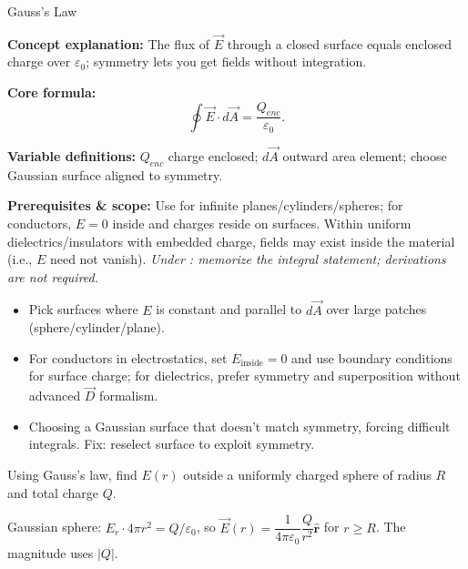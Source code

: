 \begin{KnowledgePoint}{Gauss's Law \Core}
  \KPFormulas
  \begin{formulabox}
  \textbf{Concept explanation:} The flux of $\vec E$ through a closed surface equals enclosed charge over $\varepsilon_0$; symmetry lets you get fields without integration.

  \textbf{Core formula:}
  \[
  \oint \vec E\cdot d\vec A=\frac{Q_{enc}}{\varepsilon_0}.
  \]

  \textbf{Variable definitions:} $Q_{enc}$ charge enclosed; $d\vec A$ outward area element; choose Gaussian surface aligned to symmetry.

  

  \textbf{Prerequisites \& scope:} Use for infinite planes/cylinders/spheres; for conductors, $E=0$ inside and charges reside on surfaces. Within uniform dielectrics/insulators with embedded charge, fields may exist inside the material (i.e., $E$ need not vanish). \textit{Under \Core: memorize the integral statement; derivations are not required.}
  \end{formulabox}

  \KPHeuristics
  \begin{heuristicsbox}
  \begin{itemize}[leftmargin=*]
    \item Pick surfaces where $E$ is constant and parallel to $d\vec A$ over large patches (sphere/cylinder/plane).
    \item For conductors in electrostatics, set $E_{\text{inside}}=0$ and use boundary conditions for surface charge; for dielectrics, prefer symmetry and superposition without advanced $\vec D$ formalism.
  \end{itemize}
  \vspace{0.4em}
  \begin{itemize}[leftmargin=*]
    \item Choosing a Gaussian surface that doesn't match symmetry, forcing difficult integrals. Fix: reselect surface to exploit symmetry.
  \end{itemize}
  \end{heuristicsbox}

  \KPProblems
\begin{cheatproblem}
  Using Gauss's law, find $E(r)$ outside a uniformly charged sphere of radius $R$ and total charge $Q$.
  \begin{solutionbox}
  Gaussian sphere: $E_r\cdot4\pi r^2=Q/\varepsilon_0$, so $\vec E(r)=\dfrac{1}{4\pi\varepsilon_0}\dfrac{Q}{r^2}\hat{\mathbf r}$ for $r\ge R$. The magnitude uses $|Q|$.
  \end{solutionbox}
  \end{cheatproblem}
\end{KnowledgePoint}


